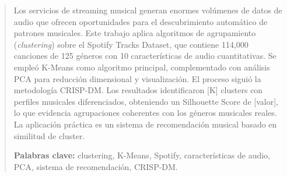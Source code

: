 \begin{abstract}
Los servicios de streaming musical generan enormes volúmenes de datos de
audio que ofrecen oportunidades para el descubrimiento automático de
patrones musicales. Este trabajo aplica algoritmos de agrupamiento
(\textit{clustering}) sobre el Spotify Tracks Dataset, que contiene
114,000 canciones de 125 géneros con 10 características de audio cuantitativas.
Se empleó K-Means como algoritmo principal, complementado con análisis PCA
para reducción dimensional y visualización. El proceso siguió la metodología
CRISP-DM. Los resultados identificaron [K] clusters con perfiles musicales
diferenciados, obteniendo un Silhouette Score de [valor], lo que evidencia
agrupaciones coherentes con los géneros musicales reales. La aplicación
práctica es un sistema de recomendación musical basado en similitud
de cluster.

\textbf{Palabras clave:} clustering, K-Means, Spotify, características de audio,
PCA, sistema de recomendación, CRISP-DM.
\end{abstract}
